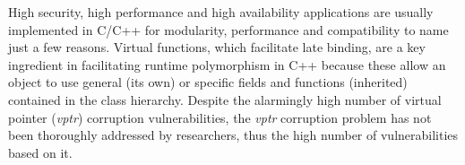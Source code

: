 
% 



High security, high performance and high availability 
applications are usually implemented in C/C++ for modularity, 
performance and compatibility to name just a few reasons.
Virtual functions, which facilitate late binding,
are a key ingredient in facilitating runtime polymorphism
in C++ because these allow an object to use general (its own) 
or specific fields and functions (inherited) contained in the class hierarchy.
Despite the alarmingly high number of virtual pointer (\textit{vptr}) corruption
vulnerabilities, the \textit{vptr} corruption problem has not
been thoroughly addressed by researchers, thus the high number of vulnerabilities
based on it.


